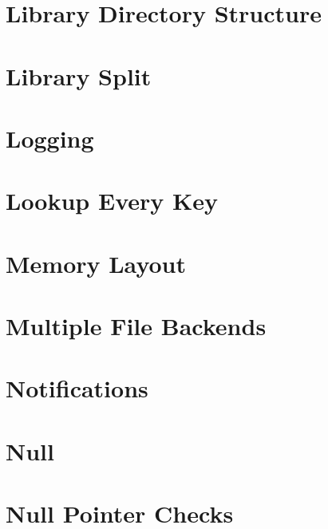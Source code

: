 \let\mypdfximage\pdfximage\def\pdfximage{\immediate\mypdfximage}\documentclass[twoside]{book}
\newcommand{\+}{\discretionary{\mbox{\scriptsize$\hookleftarrow$}}{}{}}
\begin{document}
\chapter{Library Directory Structure}
\label{doc_decisions_library_directory_structure_md}

\chapter{Library Split}
\label{doc_decisions_library_split_md}

\chapter{Logging}
\label{doc_decisions_logging_md}

\chapter{Lookup Every Key}
\label{doc_decisions_lookup_every_key_md}

\chapter{Memory Layout}
\label{doc_decisions_memory_layout_md}

\chapter{Multiple File Backends}
\label{doc_decisions_multiple_file_backends_md}

\chapter{Notifications}
\label{doc_decisions_notifications_md}

\chapter{Null}
\label{doc_decisions_null_md}

\chapter{Null Pointer Checks}
\label{doc_decisions_null_pointer_checks_md}

\end{document}
